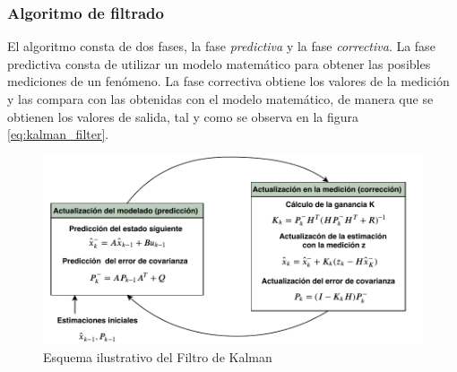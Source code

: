 		\subsubsection{Algoritmo de filtrado}
El algoritmo consta de dos fases, la fase \textit{predictiva} y la fase \textit{correctiva}. La fase predictiva consta de utilizar un modelo matemático para obtener las posibles mediciones de un fenómeno. La fase correctiva obtiene los valores de la medición y las compara con las obtenidas con el modelo matemático, de manera que se obtienen los valores de salida, tal y como se observa en la figura \ref{eq:kalman_filter}.

\begin{figure}
\centering
\includegraphics[scale=0.7]{images/kalman_algorithm.pdf}
\caption{Esquema ilustrativo del Filtro de Kalman}
\label{fig:Kalman_scheme}
\end{figure}
